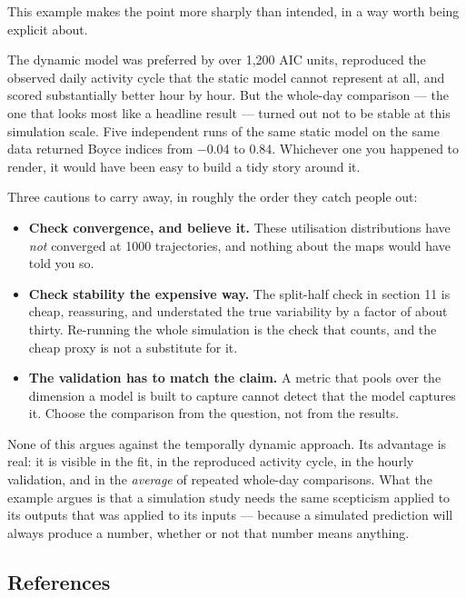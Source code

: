 \documentclass[
  letterpaper,
  DIV=11,
  numbers=noendperiod]{scrartcl}
\providecommand{\tightlist}{%
  \setlength{\itemsep}{0pt}\setlength{\parskip}{0pt}}
\begin{document}
This example makes the point more sharply than intended, in a way worth
being explicit about.

The dynamic model was preferred by over 1,200 AIC units, reproduced the
observed daily activity cycle that the static model cannot represent at
all, and scored substantially better hour by hour. But the whole-day
comparison --- the one that looks most like a headline result --- turned
out not to be stable at this simulation scale. Five independent runs of
the same static model on the same data returned Boyce indices from −0.04
to 0.84. Whichever one you happened to render, it would have been easy
to build a tidy story around it.

Three cautions to carry away, in roughly the order they catch people
out:

\begin{itemize}
\tightlist
\item
  \textbf{Check convergence, and believe it.} These utilisation
  distributions have \emph{not} converged at 1000 trajectories, and
  nothing about the maps would have told you so.
\item
  \textbf{Check stability the expensive way.} The split-half check in
  section 11 is cheap, reassuring, and understated the true variability
  by a factor of about thirty. Re-running the whole simulation is the
  check that counts, and the cheap proxy is not a substitute for it.
\item
  \textbf{The validation has to match the claim.} A metric that pools
  over the dimension a model is built to capture cannot detect that the
  model captures it. Choose the comparison from the question, not from
  the results.
\end{itemize}

None of this argues against the temporally dynamic approach. Its
advantage is real: it is visible in the fit, in the reproduced activity
cycle, in the hourly validation, and in the \emph{average} of repeated
whole-day comparisons. What the example argues is that a simulation
study needs the same scepticism applied to its outputs that was applied
to its inputs --- because a simulated prediction will always produce a
number, whether or not that number means anything.

\subsection{References}\label{references}
\end{document}
